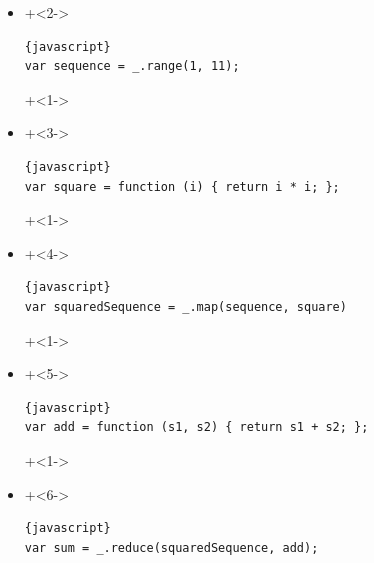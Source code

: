 \begin{frame}[fragile]{}
\begin{itemize}
\item {}
\onslide+<2->
\begin{lstlisting}{javascript}
var sequence = _.range(1, 11);
\end{lstlisting}
\onslide+<1->
\item {}
\onslide+<3->
\begin{lstlisting}{javascript}
var square = function (i) { return i * i; };
\end{lstlisting}
\onslide+<1->
\item {}
\onslide+<4->
\begin{lstlisting}{javascript}
var squaredSequence = _.map(sequence, square)
\end{lstlisting}
\onslide+<1->
\item {}
\onslide+<5->
\begin{lstlisting}{javascript}
var add = function (s1, s2) { return s1 + s2; };
\end{lstlisting}
\onslide+<1->
\item {}
\onslide+<6->
\begin{lstlisting}{javascript}
var sum = _.reduce(squaredSequence, add);
\end{lstlisting}
\end{itemize}

\end{frame}

